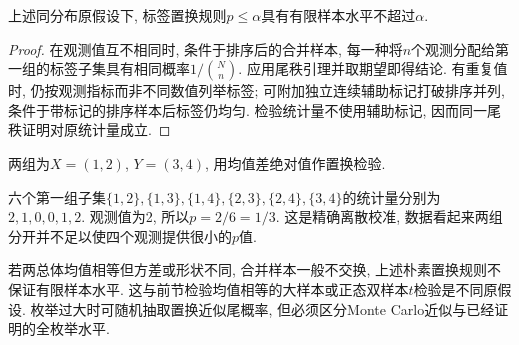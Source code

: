 \begin{proposition}[标签置换检验的水平]
上述同分布原假设下, 标签置换规则$p\leq\alpha$具有有限样本水平不超过$\alpha$.
\end{proposition}
\begin{proof}
在观测值互不相同时, 条件于排序后的合并样本, 每一种将$n$个观测分配给第一组的标签子集具有相同概率$1/\binom Nn$. 应用尾秩引理并取期望即得结论. 有重复值时, 仍按观测指标而非不同数值列举标签; 可附加独立连续辅助标记打破排序并列, 条件于带标记的排序样本后标签仍均匀. 检验统计量不使用辅助标记, 因而同一尾秩证明对原统计量成立.
\end{proof}
\begin{example}
两组为$X=(1,2)$, $Y=(3,4)$, 用均值差绝对值作置换检验.
\end{example}
\begin{solution}
六个第一组子集$\{1,2\},\{1,3\},\{1,4\},\{2,3\},\{2,4\},\{3,4\}$的统计量分别为$2,1,0,0,1,2$. 观测值为2, 所以$p=2/6=1/3$. 这是精确离散校准, 数据看起来两组分开并不足以使四个观测提供很小的$p$值.
\end{solution}
若两总体均值相等但方差或形状不同, 合并样本一般不交换, 上述朴素置换规则不保证有限样本水平. 这与前节检验均值相等的大样本或正态双样本$t$检验是不同原假设. 枚举过大时可随机抽取置换近似尾概率, 但必须区分Monte Carlo近似与已经证明的全枚举水平.

